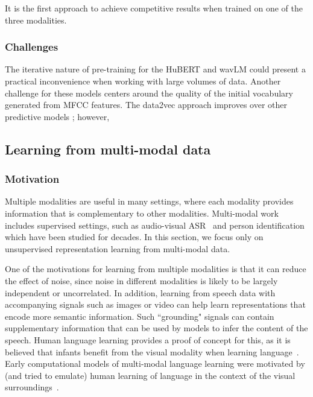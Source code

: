  It is the first approach to achieve competitive results when trained on  one of the three modalities. 

\subsubsection{Challenges}
The iterative nature of pre-training for the HuBERT and wavLM could present a practical inconvenience when working with large volumes of data. Another challenge for these models centers around the quality of the initial vocabulary generated from MFCC features. 
The data2vec approach improves over other predictive models ; however, 

\subsection{Learning from multi-modal data}
\subsubsection{Motivation}
Multiple modalities are useful in many settings, where each modality provides information that is complementary to other modalities.  Multi-modal work includes supervised settings, such as audio-visual ASR~\cite{petajan1984automatic,potamianos2003recent} and person identification~\cite{aleksic2006audio} which have been studied for decades.  In this section, we focus only on unsupervised representation learning from multi-modal data.

One of the motivations for learning from multiple modalities is that it can reduce the effect of noise, since noise in different modalities is likely to be largely independent or uncorrelated.  In addition, learning from speech data with accompanying signals such as images or video can help learn representations that encode more semantic information. Such ``grounding" signals can contain supplementary information that can be used by models to infer the content of the speech. Human language learning provides a proof of concept for this, as it is believed that infants benefit from the visual modality when learning language~\cite{legerstee1990infants}. Early computational models of multi-modal language learning were motivated by (and tried to emulate) human learning of language in the context of the visual surroundings~\cite{roy1999learning}.

